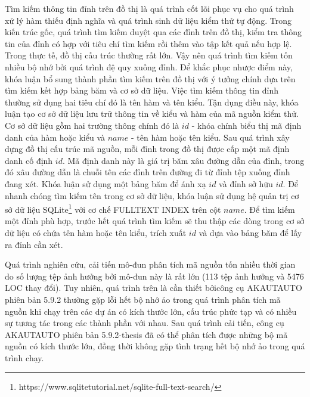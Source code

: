 Tìm kiếm thông tin đỉnh trên đồ thị là quá trình cốt lõi phục vụ cho quá trình xử lý hàm thiếu định nghĩa và quá trình sinh dữ liệu kiểm thử tự động. Trong kiến trúc gốc, quá trình tìm kiếm duyệt qua các đỉnh trên đồ thị, kiểm tra thông tin của đỉnh có hợp với tiêu chí tìm kiếm rồi thêm vào tập kết quả nếu hợp lệ. Trong thực tế, đồ thị cấu trúc thường rất lớn. Vậy nên quá trình tìm kiếm tốn nhiều bộ nhớ bởi quá trình đệ quy xuống đỉnh. Để khắc phục nhược điểm này, khóa luận bổ sung thành phần tìm kiếm trên đồ thị với ý tưởng chính dựa trên tìm kiếm kết hợp bảng băm và cơ sở dữ liệu. Việc tìm kiếm thông tin đỉnh thường sử dụng hai tiêu chí đó là tên hàm và tên kiểu. Tận dụng điều này, khóa luận tạo cơ sở dữ liệu lưu trữ thông tin về kiểu và hàm của mã nguồn kiểm thử. Cơ sở dữ liệu gồm hai trường thông chính đó là $id$ - khóa chính biểu thị mã định danh của hàm hoặc kiểu và $name$ - tên hàm hoặc tên kiểu. Sau quá trình xây dựng đồ thị cấu trúc mã nguồn, mỗi đỉnh trong đồ thị được cấp một mã định danh cố định $id$. Mã định danh này là giá trị băm xâu đường dẫn của đỉnh, trong đó xâu đường dẫn là chuỗi tên các đỉnh trên đường đi từ đỉnh tệp xuống đỉnh đang xét. Khóa luận sử dụng một bảng băm để ánh xạ $id$ và đỉnh sở hữu $id$. Để nhanh chóng tìm kiếm tên trong cơ sở dữ liệu, khóa luận sử dụng hệ quản trị cơ sở dữ liệu SQLite\footnote{https://www.sqlitetutorial.net/sqlite-full-text-search/} với cơ chế FULLTEXT INDEX trên cột $name$. Để tìm kiếm một đỉnh phù hợp, trước hết quá trình tìm kiếm sẽ thu thập các dòng trong cơ sở dữ liệu có chứa tên hàm hoặc tên kiểu, trích xuất $id$ và dựa vào bảng băm để lấy ra đỉnh cần xét. 

Quá trình nghiên cứu, cải tiến mô-đun phân tích mã nguồn tốn nhiều thời gian do số lượng tệp ảnh hưởng bởi mô-đun này là rất lớn (113 tệp ảnh hưởng và 5476 LOC thay đổi). Tuy nhiên, quá trình trên là cần thiết bởicông cụ AKAUTAUTO phiên bản 5.9.2 thường gặp lỗi hết bộ nhớ ảo trong quá trình phân tích mã nguồn khi chạy trên các dự án có kích thước lớn, cấu trúc phức tạp và có nhiều sự tương tác trong các thành phần với nhau. Sau quá trình cải tiến, công cụ AKAUTAUTO phiên bản 5.9.2-thesis đã có thể phân tích được những bộ mã nguồn có kích thước lớn, đồng thời không gặp tình trạng hết bộ nhớ ảo trong quá trình chạy.

